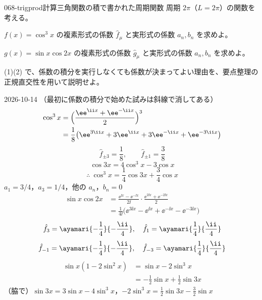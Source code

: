 \documentclass[uplatex,dvipdfmx,a4paper,11pt]{jsarticle}
\begin{document}
\begin{mondai}{068-trigprod}{計算}{三角関数の積で書かれた周期関数}
周期 $2\pi$（$L=2\pi$）の関数を考える。
\begin{shoumon}
  \item $f(x)=\cos^{3}x$ の複素形式の係数 $\hat{f}_{\mu}$ と実形式の係数 $a_n,b_n$ を求めよ。
  \item $g(x)=\sin x\cos2x$ の複素形式の係数 $\hat{g}_{\mu}$ と実形式の係数 $a_n,b_n$ を求めよ。
  \item (1)(2) で、係数の積分を実行しなくても係数が決まってよい理由を、要点整理の正規直交性を用いて説明せよ。
\end{shoumon}
\begin{kotaeutsushi}{2026-10-14}
（最初に係数の積分で始めた試みは斜線で消してある）
\begin{align*}
  \cos^{3}x&=\Bigl(\frac{\ee^{\ii x}+\ee^{-\ii x}}{2}\Bigr)^{3}\\
  &=\frac{1}{8}\bigl(\ee^{3\ii x}+3\ee^{\ii x}+3\ee^{-\ii x}+\ee^{-3\ii x}\bigr)
\end{align*}
\[ \hat{f}_{\pm3}=\frac{1}{8},\qquad\hat{f}_{\pm1}=\frac{3}{8} \]
\[ \cos3x=4\cos^{3}x-3\cos x \]
\[ \therefore\ \cos^{3}x=\frac{1}{4}\cos3x+\frac{3}{4}\cos x \]
$a_1=3/4$，$a_3=1/4$，他の $a_n$，$b_n=0$
\begin{align*}
  \sin x\cos2x&=\frac{\ee^{\ii x}-\ee^{-\ii x}}{2\ii}\cdot\frac{\ee^{2\ii x}+\ee^{-2\ii x}}{2}\\
  &=\frac{1}{4\ii}\bigl(\ee^{3\ii x}-\ee^{\ii x}+\ee^{-\ii x}-\ee^{-3\ii x}\bigr)
\end{align*}
\[ \hat{f}_3=\ayamari{-\frac{1}{4}}{-\frac{\ii}{4}},\quad\hat{f}_1=\ayamari{\frac{1}{4}}{\frac{\ii}{4}} \]
\[ \hat{f}_{-1}=\ayamari{-\frac{1}{4}}{-\frac{\ii}{4}},\quad\hat{f}_{-3}=\ayamari{\frac{1}{4}}{\frac{\ii}{4}} \]
\begin{align*}
  \sin x(1-2\sin^{2}x)&=\sin x-2\sin^{3}x\\
  &=-\frac{1}{2}\sin x+\frac{1}{2}\sin3x
\end{align*}
（脇で）$\sin3x=3\sin x-4\sin^{3}x$，$-2\sin^{3}x=\frac{1}{2}\sin3x-\frac{3}{2}\sin x$

\end{kotaeutsushi}
\end{mondai}
\end{document}
